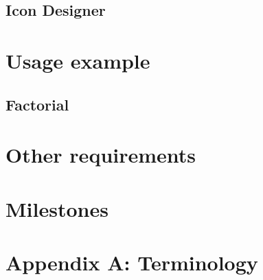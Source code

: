 \documentclass[r]{article}
\begin{document}
        \subsection{Icon Designer}

    \section{Usage example}
        \subsection{Factorial}


    \section{Other requirements}


    \section{Milestones}


    \section*{Appendix A: Terminology}
\end{document}
